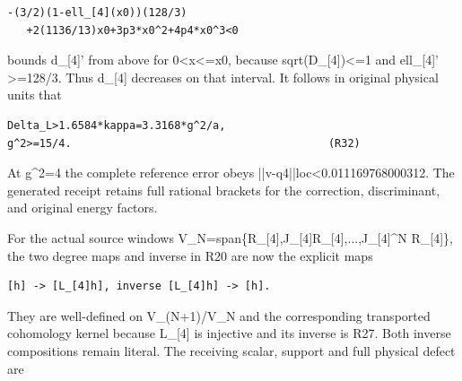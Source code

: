 \documentclass[11pt,a4paper]{article}
\renewcommand{\[}{\begingroup\small\originaldisplaystart}
\renewcommand{\]}{\originaldisplayend\endgroup}
\begin{document}
\begin{verbatim}
-(3/2)(1-ell_[4](x0))(128/3)
   +2(1136/13)x0+3p3*x0^2+4p4*x0^3<0
\end{verbatim}

bounds d\_{[}4{]}' from above for 0\textless x\textless=x0, because
sqrt(D\_{[}4{]})\textless=1 and ell\_{[}4{]}' \textgreater=128/3. Thus
d\_{[}4{]} decreases on that interval. It follows in original physical
units that

\begin{verbatim}
Delta_L>1.6584*kappa=3.3168*g^2/a,
g^2>=15/4.                                        (R32)
\end{verbatim}

At g\^{}2=4 the complete reference error obeys
{\ttfamily |\allowbreak{}|\allowbreak{}v\allowbreak{}-\allowbreak{}q\allowbreak{}4\allowbreak{}|\allowbreak{}|\allowbreak{}l\allowbreak{}o\allowbreak{}c\allowbreak{}\textless{}\allowbreak{}0\allowbreak{}.\allowbreak{}0\allowbreak{}1\allowbreak{}1\allowbreak{}1\allowbreak{}6\allowbreak{}9\allowbreak{}7\allowbreak{}6\allowbreak{}8\allowbreak{}0\allowbreak{}0\allowbreak{}0\allowbreak{}3\allowbreak{}1\allowbreak{}2\allowbreak{}}.
The generated receipt retains full rational brackets for the correction,
discriminant, and original energy factors.

For the actual source windows
{\ttfamily V\allowbreak{}\_\allowbreak{}N\allowbreak{}=\allowbreak{}s\allowbreak{}p\allowbreak{}a\allowbreak{}n\allowbreak{}\{\allowbreak{}R\allowbreak{}\_\allowbreak{}[\allowbreak{}4\allowbreak{}]\allowbreak{},\allowbreak{}J\allowbreak{}\_\allowbreak{}[\allowbreak{}4\allowbreak{}]\allowbreak{}R\allowbreak{}\_\allowbreak{}[\allowbreak{}4\allowbreak{}]\allowbreak{},\allowbreak{}.\allowbreak{}.\allowbreak{}.\allowbreak{},\allowbreak{}J\allowbreak{}\_\allowbreak{}[\allowbreak{}4\allowbreak{}]\allowbreak{}\textasciicircum{}\allowbreak{}N\allowbreak{} \allowbreak{}R\allowbreak{}\_\allowbreak{}[\allowbreak{}4\allowbreak{}]\allowbreak{}\}\allowbreak{}},
the two degree maps and inverse in R20 are now the explicit maps

\begin{verbatim}
[h] -> [L_[4]h], inverse [L_[4]h] -> [h].
\end{verbatim}

They are well-defined on
{\ttfamily V\allowbreak{}\_\allowbreak{}(\allowbreak{}N\allowbreak{}+\allowbreak{}1\allowbreak{})\allowbreak{}/\allowbreak{}V\allowbreak{}\_\allowbreak{}N\allowbreak{}}
and the corresponding transported cohomology kernel because L\_{[}4{]}
is injective and its inverse is R27. Both inverse compositions remain
literal. The receiving scalar, support and full physical defect are
\end{document}
